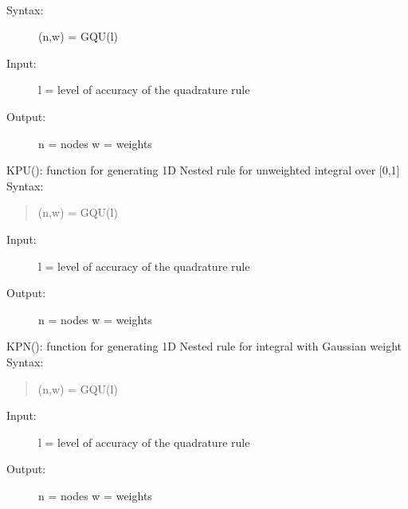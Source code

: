 \documentclass[letterpaper,10pt,english]{sphinxmanual}
\begin{document}

\begin{fulllineitems}
\label{index:SpectralToolbox.SparseGrids.GQN}~\begin{description}
\item[{Syntax:}] \leavevmode
(n,w) = GQU(l)

\item[{Input:}] \leavevmode
l = level of accuracy of the quadrature rule

\item[{Output:}] \leavevmode
n = nodes
w = weights

\end{description}

\end{fulllineitems}


\begin{fulllineitems}
\label{index:SpectralToolbox.SparseGrids.KPU}
KPU(): function for generating 1D Nested rule for unweighted integral over {[}0,1{]}
Syntax:
\begin{quote}

(n,w) = GQU(l)
\end{quote}
\begin{description}
\item[{Input:}] \leavevmode
l = level of accuracy of the quadrature rule

\item[{Output:}] \leavevmode
n = nodes
w = weights

\end{description}

\end{fulllineitems}


\begin{fulllineitems}
\label{index:SpectralToolbox.SparseGrids.KPN}
KPN(): function for generating 1D Nested rule for integral with Gaussian weight
Syntax:
\begin{quote}

(n,w) = GQU(l)
\end{quote}
\begin{description}
\item[{Input:}] \leavevmode
l = level of accuracy of the quadrature rule

\item[{Output:}] \leavevmode
n = nodes
w = weights

\end{description}

\end{fulllineitems}
\end{document}
